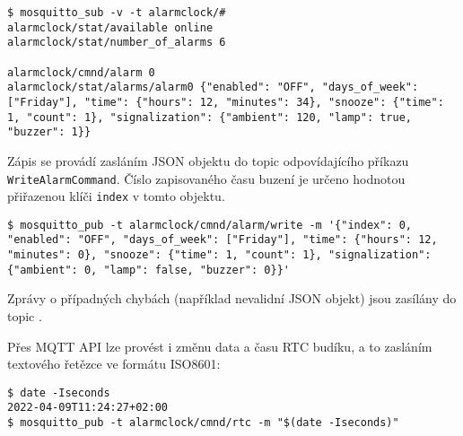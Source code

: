 \begin{lstlisting}[style=terminal]
$ mosquitto_sub -v -t alarmclock/#
alarmclock/stat/available online
alarmclock/stat/number_of_alarms 6

alarmclock/cmnd/alarm 0
alarmclock/stat/alarms/alarm0 {"enabled": "OFF", "days_of_week": ["Friday"], "time": {"hours": 12, "minutes": 34}, "snooze": {"time": 1, "count": 1}, "signalization": {"ambient": 120, "lamp": true, "buzzer": 1}}
\end{lstlisting}

Zápis se provádí zasláním JSON objektu do topic odpovídajícího příkazu
\texttt{WriteAlarmCommand}. Číslo zapisovaného času buzení je určeno hodnotou
přiřazenou klíči \texttt{index} v tomto objektu.
\begin{lstlisting}[style=terminal]
$ mosquitto_pub -t alarmclock/cmnd/alarm/write -m '{"index": 0, "enabled": "OFF", "days_of_week": ["Friday"], "time": {"hours": 12, "minutes": 0}, "snooze": {"time": 1, "count": 1}, "signalization": {"ambient": 0, "lamp": false, "buzzer": 0}}'
\end{lstlisting}
Zprávy o případných chybách (například nevalidní JSON objekt) jsou zasílány do
topic .

Přes MQTT API lze provést i změnu data a času \acs{RTC} budíku, a to zasláním
textového řetězce ve formátu ISO8601:
\begin{lstlisting}[style=terminal]
$ date -Iseconds
2022-04-09T11:24:27+02:00
$ mosquitto_pub -t alarmclock/cmnd/rtc -m "$(date -Iseconds)"
\end{lstlisting}



